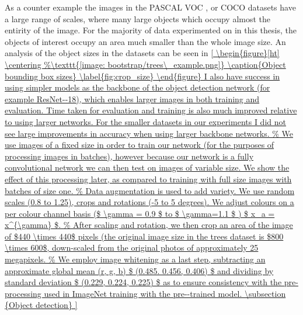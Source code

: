 As a counter example the images in the PASCAL VOC \cite{Everingham}, or COCO\cite{Lin2014} datasets have a large range of scales, where many large objects which occupy almost the entirity of the image. For the majority of data experimented on in this thesis, the objects of interest occupy an area much smaller than the whole image size. An analysis of the object sizes in the datasets can be seen in \ref {


\begin{figure}[ht]
\centering

\caption{Object bounding box sizes}
\label{fig:crop_size}
\end{figure}



I also have success in using simpler models as the backbone of the object detection network (for example ResNet--18), which enables larger images in both training and evaluation. Time taken for evaluation and training is also much improved relative to using larger networks. For the smaller datasets in our experiments I did not see large improvements in accuracy when using larger backbone networks.








\subsection {Object detection}

}
